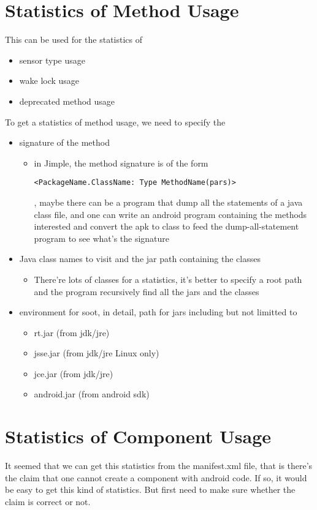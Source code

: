 \documentclass{article}
\begin{document}
\section{Statistics of Method Usage}
This can be used for the statistics of 
\begin{itemize}
	\item sensor type usage
	\item wake lock usage
	\item deprecated method usage
\end{itemize}
\par{
To get a statistics of method usage, we need to specify the 
\begin{itemize}
	\item signature of the method
		\begin{itemize}
		\item in Jimple, the method signature is of the form
			\begin{verbatim}<PackageName.ClassName: Type MethodName(pars)>\end{verbatim}
			, maybe there can be a program that dump all the statements of a java class file, 
			and one can write an android program containing the methods interested and convert 
			the apk to class to feed the dump-all-statement program to see what's the signature
		\end{itemize}
	\item Java class names to visit and the jar path containing the classes
		\begin{itemize}
			\item There're lots of classes for a statistics, it's better to specify a 
			root path and the program recursively find all the jars and the classes
		\end{itemize}
	\item environment for soot, in detail, path for jars including but not limitted to
		\begin{itemize}
			\item rt.jar (from jdk/jre)
			\item jsse.jar (from jdk/jre Linux only)
			\item jce.jar (from jdk/jre)
			\item android.jar (from android sdk)
		\end{itemize}
\end{itemize}
}
\section{Statistics of Component Usage}
It seemed that we can get this statistics from the manifest.xml file, 
that is there's the claim that one cannot create a component with android code. 
If so, it would be easy to get this kind of statistics. 
But first need to make sure whether the claim is correct or not.
\end{document}
